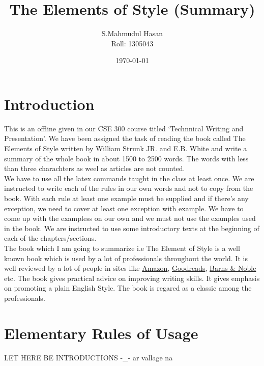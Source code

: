 \documentclass{report}
\begin{document}
\title{The Elements of Style (Summary)}
\author{S.Mahmudul Hasan\\Roll: 1305043}
\date{\today}
\maketitle
\tableofcontents


\chapter{Introduction}
\raggedright  %
This is an offline given in our CSE 300 course titled `Technnical Writing and Presentation'. We have been assigned the task of reading the book called The Elements of Style written by William Strunk JR. and E.B. White and write a summary of the whole book in about 1500 to 2500 words. The words with less than three charachters as weel as articles are not counted.\\
We have to use all the latex commands taught in the class at least once. We are instructed to write each of the rules in our own words and not to copy from the book. With each rule at least one example must be supplied and if there's any exception, we need to cover at least one exception with example. We have to come up with the exampless on our own and we must not use the examples used in the book. We are instructed to use some introductory texts at the beginning of each of the chapters/sections.\\
The book which I am going to summarize i.e The Element of Style is a well known book which is used by a lot of professionals throughout the world. It is well reviewed by a lot of people in sites like \href{https://www.amazon.com/Elements-Style-William-Strunk-Jr/dp/1557427283}{Amazon}, \href{http://www.goodreads.com/book/show/33514.The_Elements_of_Style}{Goodreads}, \href{http://www.barnesandnoble.com/w/the-elements-of-style-william-strunk/1116794279}{Barns \& Noble} etc.
The book gives practical advice on improving writing skills. It gives emphasis on promoting a plain English Style. The book is regared as a classic among the professionals.

\chapter{Elementary Rules of Usage}
\raggedright
LET HERE BE INTRODUCTIONS -_- ar vallage na 

\section{}
\end{document}

